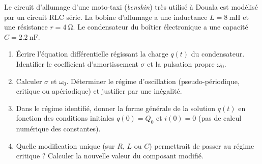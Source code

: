 \documentclass[11pt]{article}
\begin{document}
\begin{exercice}
Le circuit d'allumage d'une moto-taxi (\textit{benskin}) très utilisé à Douala est modélisé par un circuit RLC série. La bobine d'allumage a une inductance $L = \SI{8}{\milli\henry}$ et une résistance $r = \SI{4}{\ohm}$. Le condensateur du boîtier électronique a une capacité $C = \SI{2.2}{\nano\farad}$.
\begin{enumerate}
    \item Écrire l'équation différentielle régissant la charge $q(t)$ du condensateur. Identifier le coefficient d'amortissement $\sigma$ et la pulsation propre $\omega_0$.
    \item Calculer $\sigma$ et $\omega_0$. Déterminer le régime d'oscillation (pseudo-périodique, critique ou apériodique) et justifier par une inégalité.
    \item Dans le régime identifié, donner la forme générale de la solution $q(t)$ en fonction des conditions initiales $q(0)=Q_0$ et $i(0)=0$ (pas de calcul numérique des constantes).
    \item Quelle modification unique (sur $R$, $L$ ou $C$) permettrait de passer au régime critique ? Calculer la nouvelle valeur du composant modifié.
\end{enumerate}
\end{exercice}
\end{document}
